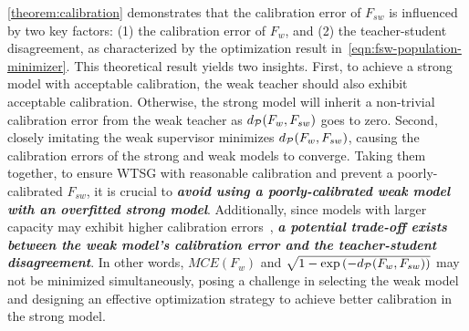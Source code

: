 \cref{theorem:calibration} demonstrates that the calibration error of $F_{sw}$ is influenced by two key factors: (1) the calibration error of $F_w$, and (2) the teacher-student disagreement, as characterized by the optimization result in~\cref{eqn:fsw-population-minimizer}.
This theoretical result yields two insights.
First, to achieve a strong model with acceptable calibration, the weak teacher should also exhibit acceptable calibration. Otherwise, the strong model will inherit a non-trivial calibration error from the weak teacher as $d_\mathcal{P}(F_w,F_{sw})$ goes to zero.
Second, closely imitating the weak supervisor minimizes $d_\mathcal{P}(F_w,F_{sw})$, causing the calibration errors of the strong and weak models to converge. 
Taking them together, to ensure WTSG with reasonable calibration and prevent a poorly-calibrated $F_{sw}$, it is crucial to \textit{\textbf{avoid using a poorly-calibrated weak model with an overfitted strong model}}.
Additionally, since models with larger capacity may exhibit higher calibration errors~\citep{guo2017calibration}, \textit{\textbf{a potential trade-off exists between the weak model's calibration error and the teacher-student disagreement}}.
In other words, $\textit{MCE}(F_w)$ and $\sqrt{1-\exp{\left(-d_\mathcal{P}(F_w,F_{sw})\right)}}$ may not be minimized simultaneously, posing a challenge in selecting the weak model and designing an effective optimization strategy to achieve better calibration in the strong model.








